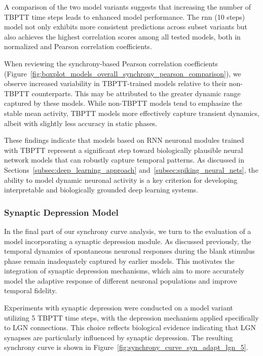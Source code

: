 A comparison of the two model variants suggests that increasing the number of TBPTT time steps leads to enhanced model performance. The rnn (10 steps) model not only exhibits more consistent predictions across subset variants but also achieves the highest correlation scores among all tested models, both in normalized and Pearson correlation coefficients.

When reviewing the synchrony-based Pearson correlation coefficients (Figure~\ref{fig:boxplot_models_overall_synchrony_pearson_comparison}), we observe increased variability in TBPTT-trained models relative to their non-TBPTT counterparts. This may be attributed to the greater dynamic range captured by these models. While non-TBPTT models tend to emphasize the stable mean activity, TBPTT models more effectively capture transient dynamics, albeit with slightly less accuracy in static phases.

These findings indicate that models based on RNN neuronal modules trained with TBPTT represent a significant step toward biologically plausible neural network models that can robustly capture temporal patterns. As discussed in Sections~\ref{subsec:deep_learning_approach} and~\ref{subsec:spiking_neural_nets}, the ability to model dynamic neuronal activity is a key criterion for developing interpretable and biologically grounded deep learning systems.

\subsubsection{Synaptic Depression Model}
\label{{subsubsec:syn_adap_lgn_5}}

In the final part of our synchrony curve analysis, we turn to the evaluation of a model incorporating a synaptic depression module. As discussed previously, the temporal dynamics of spontaneous neuronal responses during the blank stimulus phase remain inadequately captured by earlier models. This motivates the integration of synaptic depression mechanisms, which aim to more accurately model the adaptive response of different neuronal populations and improve temporal fidelity.

Experiments with synaptic depression were conducted on a model variant utilizing 5 TBPTT time steps, with the depression mechanism applied specifically to LGN connections. This choice reflects biological evidence indicating that LGN synapses are particularly influenced by synaptic depression. The resulting synchrony curve is shown in Figure~\ref{fig:synchrony_curve_syn_adapt_lgn_5}.

